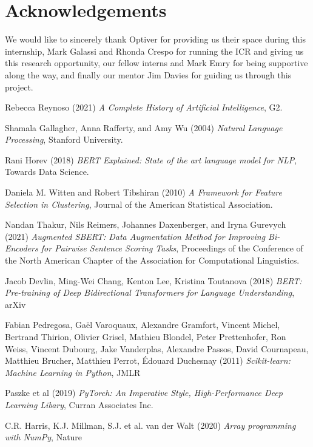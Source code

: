 \documentclass[11pt, a4paper, twocolumn]{article}
\begin{document}
\section*{Acknowledgements}
We would like to sincerely thank Optiver for providing us their space during this internship, Mark Galassi and Rhonda Crespo for running the ICR and giving us this research opportunity, our fellow interns and Mark Emry for being supportive along the way, and finally our mentor Jim Davies for guiding us through this project.

\begin{thebibliography}{30}
Rebecca Reynoso (2021) \emph{A Complete History of Artificial Intelligence}, G2.

Shamala Gallagher, Anna Rafferty, and Amy Wu (2004) \emph{Natural Language Processing}, Stanford University.

Rani Horev (2018) \emph{BERT Explained: State of the art language model for NLP}, Towards Data Science.

Daniela M. Witten and Robert Tibshiran (2010) \emph{A Framework for Feature Selection in Clustering}, Journal of the American Statistical Association.

Nandan Thakur, Nils Reimers, Johannes Daxenberger, and Iryna Gurevych (2021) \emph{Augmented {SBERT}: Data Augmentation Method for Improving Bi-Encoders for Pairwise Sentence Scoring Tasks}, Proceedings of the Conference of the North American Chapter of the Association for Computational Linguistics.

Jacob Devlin, Ming-Wei Chang, Kenton Lee, Kristina Toutanova (2018) \emph{BERT: Pre-training of Deep Bidirectional Transformers for Language Understanding}, arXiv

Fabian Pedregosa, Gaël Varoquaux, Alexandre Gramfort, Vincent Michel, Bertrand Thirion, Olivier Grisel, Mathieu Blondel, Peter Prettenhofer, Ron Weiss, Vincent Dubourg, Jake Vanderplas, Alexandre Passos, David Cournapeau, Matthieu Brucher, Matthieu Perrot, Édouard Duchesnay (2011) \emph{Scikit-learn: Machine Learning in Python}, JMLR

Paszke et al (2019) \emph{PyTorch: An Imperative Style, High-Performance Deep Learning Libary}, Curran Associates Inc.

C.R. Harris, K.J. Millman, S.J. et al. van der Walt (2020) \emph{Array programming with NumPy}, Nature


\end{thebibliography}
\end{document}
